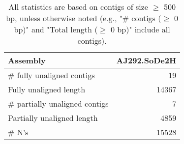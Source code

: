 \documentclass[12pt,a4paper]{article}
\begin{document}
\begin{table}[ht]
\begin{center}
\caption{All statistics are based on contigs of size $\geq$ 500 bp, unless otherwise noted (e.g., "\# contigs ($\geq$ 0 bp)" and "Total length ($\geq$ 0 bp)" include all contigs).}
\begin{tabular}{|l*{1}{|r}|}
\hline
Assembly & AJ292.SoDe2H \\ \hline
\# fully unaligned contigs & 19 \\ \hline
Fully unaligned length & 14367 \\ \hline
\# partially unaligned contigs & 7 \\ \hline
Partially unaligned length & 4859 \\ \hline
\# N's & 15528 \\ \hline
\end{tabular}
\end{center}
\end{table}
\end{document}

